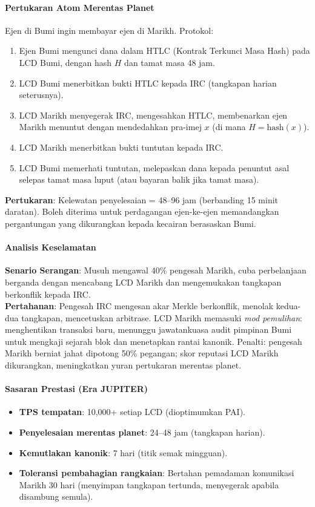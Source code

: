 \documentclass[11pt]{article}
\begin{document}
\paragraph{Pertukaran Atom Merentas Planet}
Ejen di Bumi ingin membayar ejen di Marikh. Protokol:
\begin{enumerate}[noitemsep]
  \item Ejen Bumi mengunci dana dalam HTLC (Kontrak Terkunci Masa Hash) pada LCD Bumi, dengan hash $H$ dan tamat masa 48 jam.
  \item LCD Bumi menerbitkan bukti HTLC kepada IRC (tangkapan harian seterusnya).
  \item LCD Marikh menyegerak IRC, mengesahkan HTLC, membenarkan ejen Marikh menuntut dengan mendedahkan pra-imej $x$ (di mana $H = \text{hash}(x)$).
  \item LCD Marikh menerbitkan bukti tuntutan kepada IRC.
  \item LCD Bumi memerhati tuntutan, melepaskan dana kepada penuntut asal selepas tamat masa luput (atau bayaran balik jika tamat masa).
\end{enumerate}
\textbf{Pertukaran}: Kelewatan penyelesaian = 48--96 jam (berbanding 15 minit daratan). Boleh diterima untuk perdagangan ejen-ke-ejen memandangkan pergantungan yang dikurangkan kepada kecairan berasaskan Bumi.

\paragraph{Analisis Keselamatan}
\textbf{Senario Serangan}: Musuh mengawal 40\% pengesah Marikh, cuba perbelanjaan berganda dengan mencabang LCD Marikh dan mengemukakan tangkapan berkonflik kepada IRC.\\
\textbf{Pertahanan}: Pengesah IRC mengesan akar Merkle berkonflik, menolak kedua-dua tangkapan, mencetuskan arbitrase. LCD Marikh memasuki \emph{mod pemulihan}: menghentikan transaksi baru, menunggu jawatankuasa audit pimpinan Bumi untuk mengkaji sejarah blok dan menetapkan rantai kanonik. Penalti: pengesah Marikh berniat jahat dipotong 50\% pegangan; skor reputasi LCD Marikh dikurangkan, meningkatkan yuran pertukaran merentas planet.

\paragraph{Sasaran Prestasi (Era JUPITER)}
\begin{itemize}[noitemsep]
  \item \textbf{TPS tempatan}: 10,000+ setiap LCD (dioptimumkan PAI).
  \item \textbf{Penyelesaian merentas planet}: 24--48 jam (tangkapan harian).
  \item \textbf{Kemutlakan kanonik}: 7 hari (titik semak mingguan).
  \item \textbf{Toleransi pembahagian rangkaian}: Bertahan pemadaman komunikasi Marikh 30 hari (menyimpan tangkapan tertunda, menyegerak apabila disambung semula).
\end{itemize}
\end{document}
